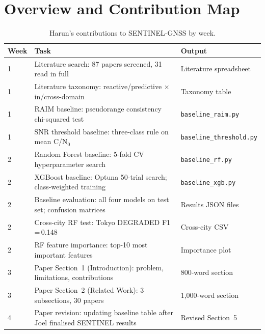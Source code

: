 \documentclass[12pt,a4paper]{article}
\newcommand{\code}[1]{\texttt{#1}}
\begin{document}
\setcounter{tocdepth}{1}
\tableofcontents
\newpage

\section{Overview and Contribution Map}

\begin{table}[H]
  \centering
  \caption{Harun's contributions to SENTINEL-GNSS by week.}
  \begin{tabularx}{\textwidth}{lXl}
    \toprule
    \textbf{Week} & \textbf{Task} & \textbf{Output} \\
    \midrule
    1 & Literature search: 87 papers screened, 31 read in full &
        Literature spreadsheet \\
    1 & Literature taxonomy: reactive/predictive $\times$ in/cross-domain &
        Taxonomy table \\
    1 & RAIM baseline: pseudorange consistency chi-squared test &
        \code{baseline\_raim.py} \\
    1 & SNR threshold baseline: three-class rule on mean C/N$_0$ &
        \code{baseline\_threshold.py} \\
    2 & Random Forest baseline: 5-fold CV hyperparameter search &
        \code{baseline\_rf.py} \\
    2 & XGBoost baseline: Optuna 50-trial search; class-weighted training &
        \code{baseline\_xgb.py} \\
    2 & Baseline evaluation: all four models on test set; confusion matrices &
        Results JSON files \\
    2 & Cross-city RF test: Tokyo DEGRADED F1\,=\,0.148 &
        Cross-city CSV \\
    2 & RF feature importance: top-10 most important features &
        Importance plot \\
    3 & Paper Section~1 (Introduction): problem, limitations, contributions &
        800-word section \\
    3 & Paper Section~2 (Related Work): 3 subsections, 30 papers &
        1,000-word section \\
    4 & Paper revision: updating baseline table after Joel finalised SENTINEL results &
        Revised Section~5 \\
    \bottomrule
  \end{tabularx}
\end{table}
\end{document}

